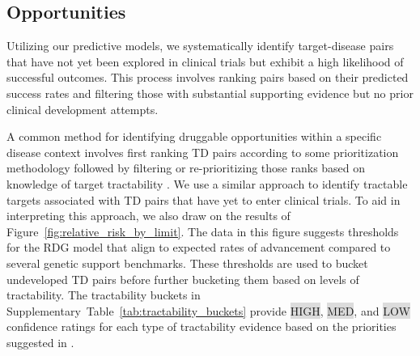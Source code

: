 \documentclass{article}
\begin{document}
\subsection{Opportunities}
\label{sec:results_opportunities}

Utilizing our predictive models, we systematically identify target-disease pairs that have not yet been explored in clinical trials but exhibit a high likelihood of successful outcomes. This process involves ranking pairs based on their predicted success rates and filtering those with substantial supporting evidence but no prior clinical development attempts.

A common method for identifying druggable opportunities within a specific disease context involves first ranking TD pairs according to some prioritization methodology followed by filtering or re-prioritizing those ranks based on knowledge of target tractability \cite{PMID:28356508,PMID:35401535,PMID:31253980}. We use a similar approach to identify tractable targets associated with TD pairs that have yet to enter clinical trials. To aid in interpreting this approach, we also draw on the results of Figure~\ref{fig:relative_risk_by_limit}. The data in this figure suggests thresholds for the RDG model that align to expected rates of advancement compared to several genetic support benchmarks. These thresholds are used to bucket undeveloped TD pairs before further bucketing them based on levels of tractability. The tractability buckets in Supplementary~Table~\ref{tab:tractability_buckets} provide \colorbox{Gainsboro}{HIGH}, \colorbox{Gainsboro}{MED}, and \colorbox{Gainsboro}{LOW} confidence ratings for each type of tractability evidence based on the priorities suggested in \cite{OTTractability}.
\end{document}
